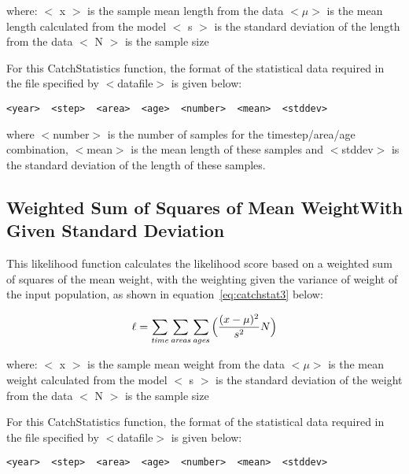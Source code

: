 \documentclass [a4paper, 10pt]{book}
\begin{document}
where:\newline
$<$ x $>$ is the sample mean length from the data\newline
$<\mu>$ is the mean length calculated from the model\newline
$<$ s $>$ is the standard deviation of the length from the data\newline
$<$ N $>$ is the sample size

\bigskip
For this CatchStatistics function, the format of the statistical data required in the file specified by $<$datafile$>$ is given below:

{\small\begin{verbatim}
<year>  <step>  <area>  <age>  <number>  <mean>  <stddev>
\end{verbatim}}

where $<$number$>$ is the number of samples for the timestep/area/age combination, $<$mean$>$ is the mean length of these samples and $<$stddev$>$ is the standard deviation of the length of these samples.

\subsection{Weighted Sum of Squares of Mean Weight\newline With Given Standard Deviation}
This likelihood function calculates the likelihood score based on a weighted sum of squares of the mean weight, with the weighting given the variance of weight of the input population, as shown in equation~\ref{eq:catchstat3} below:

\begin{equation}\label{eq:catchstat3}
\ell = \sum_{\it time}\sum_{\it areas}\sum_{\it ages} \Big(\frac{(x-\mu)^2} {s^2} N\Big)
\end{equation}

where:\newline
$<$ x $>$ is the sample mean weight from the data\newline
$<\mu>$ is the mean weight calculated from the model\newline
$<$ s $>$ is the standard deviation of the weight from the data\newline
$<$ N $>$ is the sample size

\bigskip
For this CatchStatistics function, the format of the statistical data required in the file specified by $<$datafile$>$ is given below:

{\small\begin{verbatim}
<year>  <step>  <area>  <age>  <number>  <mean>  <stddev>
\end{verbatim}}
\end{document}
